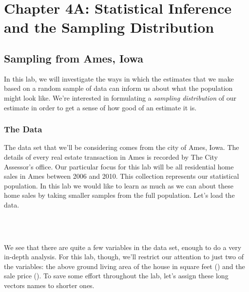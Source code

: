 \documentclass[11pt]{article}
\begin{document}
\let\thefootnote\relax{}

\section*{Chapter 4A: Statistical Inference and the Sampling Distribution}
\subsection*{Sampling from Ames, Iowa}
In this lab, we will investigate the ways in which the estimates that we make based on a random sample of data can inform us about what the population might look like.  We're interested in formulating a \emph{sampling distribution} of our estimate in order to get a sense of how good of an estimate it is.

\subsubsection*{The Data}
The data set that we'll be considering comes from the city of Ames, Iowa.  The details of every real estate transaction in Ames is recorded by The City Assessor's office.  Our particular focus for this lab will be all residential home sales in Ames between 2006 and 2010.  This collection represents our statistical population.  In this lab we would like to learn as much as we can about these home sales by taking smaller samples from the full population.  Let's load the data.

\ttfamily\noindent
\hlstd{}\hspace*{\fill}\\
\hlkeyword{(}\hlkeyword{)}\hspace*{\fill}\\
\normalfont

We see that there are quite a few variables in the data set, enough to do a very in-depth analysis.  For this lab, though, we'll restrict our attention to just two of the variables: the above ground living area of the house in square feet (\texttt{}) and the sale price (\texttt{}).  To save some effort throughout the lab, let's assign these long vectors names to shorter ones.  
\end{document}
